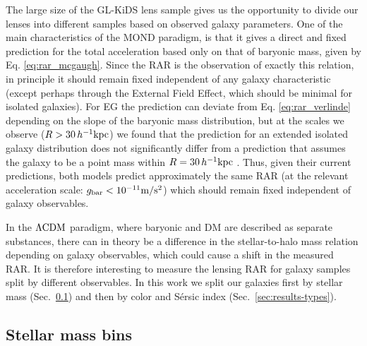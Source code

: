 \documentclass[usenatbib]{mnras}
\newcommand{\hkpc}{\, h^{-1}{\rm{kpc}} }
\newcommand{\mpss}{ {\rm m/s^2} }
\newcommand{\lcdm}{{\rm \Lambda CDM}}
\newcommand{\un}[1]{_{\rm #1}}
\begin{document}
The large size of the GL-KiDS lens sample gives us the opportunity to divide our lenses into different samples based on observed galaxy parameters. One of the main characteristics of the MOND paradigm, is that it gives a direct and fixed prediction for the total acceleration based only on that of baryonic mass, given by Eq. \ref{eq:rar_mcgaugh}. Since the RAR is the observation of exactly this relation, in principle it should remain fixed independent of any galaxy characteristic (except perhaps through the External Field Effect, which should be minimal for isolated galaxies). For EG the prediction can deviate from Eq. \ref{eq:rar_verlinde} depending on the slope of the baryonic mass distribution, but at the scales we observe ($R>30\hkpc$) we found that the prediction for an extended isolated galaxy distribution does not significantly differ from a prediction that assumes the galaxy to be a point mass within $R=30\hkpc$ \cite[see Sec.~4.3 of][]{brouwer2017}. Thus, given their current predictions, both models predict approximately the same RAR (at the relevant acceleration scale: $g\un{bar}<10^{-11} \mpss$) which should remain fixed independent of galaxy observables.

In the $\lcdm$ paradigm, where baryonic and DM are described as separate substances, there can in theory be a difference in the stellar-to-halo mass relation depending on galaxy observables, which could cause a shift in the measured RAR. It is therefore interesting to measure the lensing RAR for galaxy samples split by different observables. In this work we split our galaxies first by stellar mass (Sec.~\ref{sec:results_Mstarbins}) and then by color and S\'ersic index (Sec.~\ref{sec:results-types}).

\subsection{Stellar mass bins}
\label{sec:results_Mstarbins}
\end{document}
